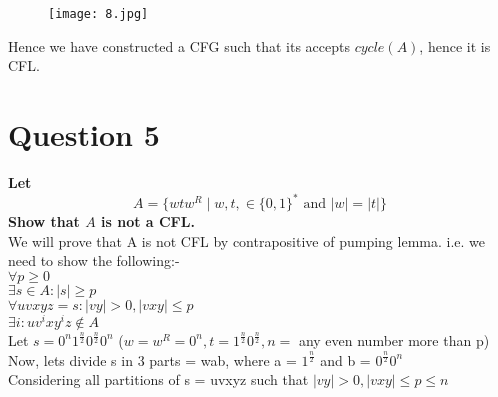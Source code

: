\documentclass{article}
\begin{document}
\begin{figure}[H]
    \centering
    \texttt{[image: 8.jpg]}
\end{figure}

Hence we have constructed a CFG such that its accepts $cycle(A)$, hence it is CFL.
\pagebreak

\section{Question 5}
\textbf{Let $$A = \{wtw^R\mid w,t, \in \{0,1\}^* \text{ \ and \ } |w| = |t|\}$$ Show that $A$ is not a CFL. }\\

We will prove that A is not CFL by contrapositive of pumping lemma. i.e. we need to show the following:- \\
$\forall p \geq 0$ \\
$\exists s \in A : |s| \geq p $ \\
$\forall uvxyz = s : |vy| > 0, |vxy| \leq p$\\
$\exists i : uv^ixy^iz \notin A$\\

Let $s = 0^n 1^{\frac{n}{2}} 0^{\frac{n}{2}} 0^n$ ($w = w^R = 0^n, t = 1^{\frac{n}{2}} 0^{\frac{n}{2}}, n = $ any even number more than p)\\
Now, lets divide s in 3 parts = wab, where a = $1^{\frac{n}{2}}$ and b = $0^{\frac{n}{2}} 0^n$\\
Considering all partitions of s = uvxyz such that $|vy| > 0, |vxy| \leq p \leq n$\\
\end{document}
